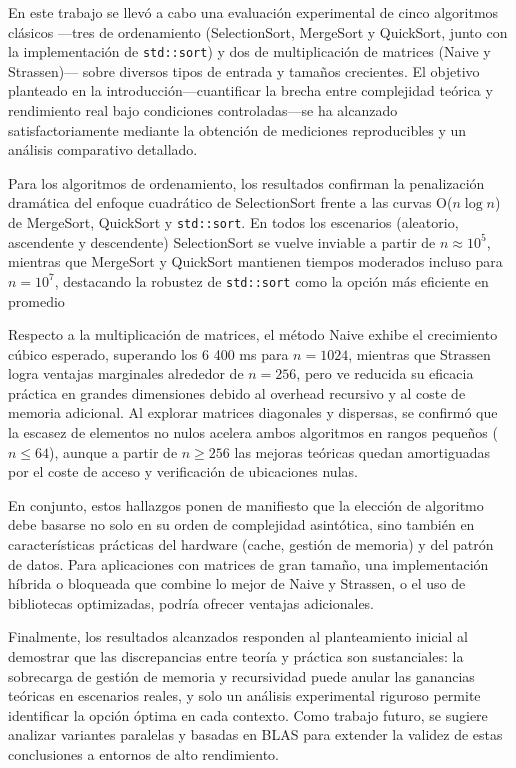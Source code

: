 En este trabajo se llevó a cabo una evaluación experimental de cinco algoritmos clásicos —tres de ordenamiento (SelectionSort, MergeSort y QuickSort, junto con la implementación de \texttt{std::sort}) y dos de multiplicación de matrices (Naive y Strassen)— sobre diversos tipos de entrada y tamaños crecientes. El objetivo planteado en la introducción—cuantificar la brecha entre complejidad teórica y rendimiento real bajo condiciones controladas—se ha alcanzado satisfactoriamente mediante la obtención de mediciones reproducibles y un análisis comparativo detallado.

Para los algoritmos de ordenamiento, los resultados confirman la penalización dramática del enfoque cuadrático de SelectionSort frente a las curvas O(\(n\log n\)) de MergeSort, QuickSort y \texttt{std::sort}. En todos los escenarios (aleatorio, ascendente y descendente) SelectionSort se vuelve inviable a partir de \(n\approx10^5\), mientras que MergeSort y QuickSort mantienen tiempos moderados incluso para \(n=10^7\), destacando la robustez de \texttt{std::sort} como la opción más eficiente en promedio

Respecto a la multiplicación de matrices, el método Naive exhibe el crecimiento cúbico esperado, superando los 6 400 ms para \(n=1024\), mientras que Strassen logra ventajas marginales alrededor de \(n=256\), pero ve reducida su eficacia práctica en grandes dimensiones debido al overhead recursivo y al coste de memoria adicional. Al explorar matrices diagonales y dispersas, se confirmó que la escasez de elementos no nulos acelera ambos algoritmos en rangos pequeños (\(n\le64\)), aunque a partir de \(n\ge256\) las mejoras teóricas quedan amortiguadas por el coste de acceso y verificación de ubicaciones nulas.

En conjunto, estos hallazgos ponen de manifiesto que la elección de algoritmo debe basarse no solo en su orden de complejidad asintótica, sino también en características prácticas del hardware (cache, gestión de memoria) y del patrón de datos. Para aplicaciones con matrices de gran tamaño, una implementación híbrida o bloqueada que combine lo mejor de Naive y Strassen, o el uso de bibliotecas optimizadas, podría ofrecer ventajas adicionales.

Finalmente, los resultados alcanzados responden al planteamiento inicial al demostrar que las discrepancias entre teoría y práctica son sustanciales: la sobrecarga de gestión de memoria y recursividad puede anular las ganancias teóricas en escenarios reales, y solo un análisis experimental riguroso permite identificar la opción óptima en cada contexto. Como trabajo futuro, se sugiere analizar variantes paralelas y basadas en BLAS para extender la validez de estas conclusiones a entornos de alto rendimiento.
